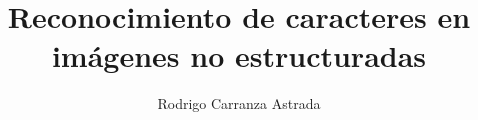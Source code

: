 \title[Reconocimiento de caracteres en imagenes no estructuradas] %
{Reconocimiento de caracteres en imágenes no estructuradas}
\author{Rodrigo Carranza Astrada}
\subject{Computer Science}
\frame{\titlepage}